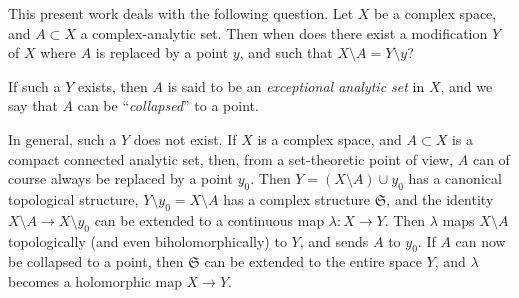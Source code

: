 \documentclass{article}
\theoremstyle{plain}
\theoremstyle{definition}
\newcommand{\fk}{\mathfrak}
\begin{document}
This present work deals with the following question.
Let $X$ be a complex space, and $A\subset X$ a complex-analytic set.
Then when does there exist a modification $Y$ of $X$ where $A$ is replaced by a point $y$, and such that $X\setminus A=Y\setminus y$?

If such a $Y$ exists, then $A$ is said to be an \emph{exceptional analytic set} in $X$, and we say that $A$ can be ``\emph{collapsed}'' to a point.

In general, such a $Y$ does not exist.
If $X$ is a complex space, and $A\subset X$ is a compact connected analytic set, then, from a set-theoretic point of view, $A$ can of course always be replaced by a point $y_0$.
Then $Y=(X\setminus A)\cup y_0$ has a canonical topological structure, $Y\setminus y_0=X\setminus A$ has a complex structure $\fk{S}$, and the identity $X\setminus A\to X\setminus y_0$ can be extended to a continuous map $\lambda\colon X\to Y$.
Then $\lambda$ maps $X\setminus A$ topologically (and even biholomorphically) to $Y$, and sends $A$ to $y_0$.
If $A$ can now be collapsed to a point, then $\fk{S}$ can be extended to the entire space $Y$, and $\lambda$ becomes a holomorphic map $X\to Y$.
\end{document}
